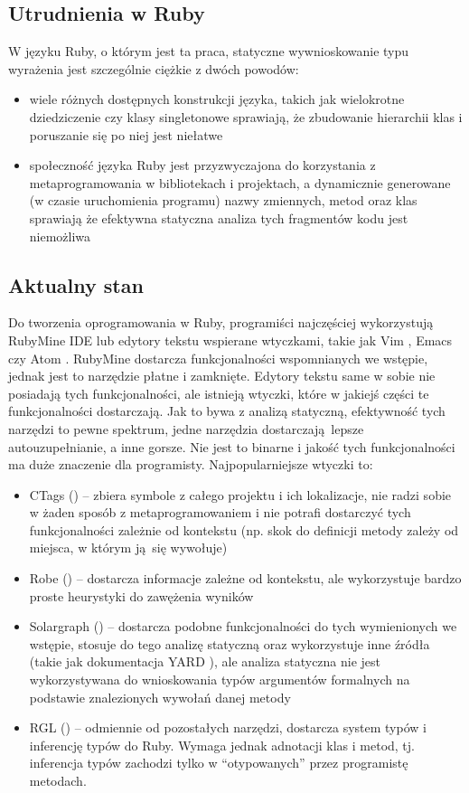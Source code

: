 \documentclass[shortabstract,mgr]{iithesis}
\begin{document}
\subsection{Utrudnienia w Ruby}

W języku Ruby, o którym jest ta praca, statyczne wywnioskowanie typu wyrażenia jest szczególnie ciężkie z dwóch powodów:
\begin{itemize}
\item wiele różnych dostępnych konstrukcji języka, takich jak wielokrotne dziedziczenie czy klasy singletonowe sprawiają, że zbudowanie hierarchii klas i poruszanie się po niej jest niełatwe
\item społeczność języka Ruby jest przyzwyczajona do korzystania z metaprogramowania w bibliotekach i projektach, a dynamicznie generowane (w czasie uruchomienia programu) nazwy zmiennych, metod oraz klas sprawiają że efektywna statyczna analiza tych fragmentów kodu jest niemożliwa
\end{itemize}

\subsection{Aktualny stan}

Do tworzenia oprogramowania w Ruby, programiści najczęściej wykorzystują RubyMine IDE \cite{RUBYMINE} lub edytory tekstu wspierane wtyczkami, takie jak Vim \cite{VIM}, Emacs \cite{EMACS} czy Atom \cite{ATOM}.
RubyMine dostarcza funkcjonalności wspomnianych we wstępie, jednak jest to narzędzie płatne i zamknięte.
Edytory tekstu same w sobie nie posiadają tych funkcjonalności, ale istnieją wtyczki, które w jakiejś części te funkcjonalności dostarczają. Jak to bywa z analizą statyczną, efektywność tych narzędzi to pewne spektrum, jedne narzędzia dostarczają lepsze autouzupełnianie, a inne gorsze. Nie jest to binarne i jakość tych funkcjonalności ma duże znaczenie dla programisty.
Najpopularniejsze wtyczki to:
\begin{itemize}
\item CTags (\cite{CTAGS}) -- zbiera symbole z całego projektu i ich lokalizacje, nie radzi sobie w żaden sposób z metaprogramowaniem i nie potrafi dostarczyć tych funkcjonalności zależnie od kontekstu (np. skok do definicji metody zależy od miejsca, w którym ją się wywołuje)
\item Robe (\cite{ROBE}) -- dostarcza informacje zależne od kontekstu, ale wykorzystuje bardzo proste heurystyki do zawężenia wyników
\item Solargraph (\cite{SOLARGRAPH}) -- dostarcza podobne funkcjonalności do tych wymienionych we wstępie, stosuje do tego analizę statyczną oraz wykorzystuje inne źródła (takie jak dokumentacja YARD \cite{YARD}), ale analiza statyczna nie jest wykorzystywana do wnioskowania typów argumentów formalnych na podstawie znalezionych wywołań danej metody
\item RGL (\cite{RDL}) -- odmiennie od pozostałych narzędzi, dostarcza system typów i inferencję typów do Ruby. Wymaga jednak adnotacji klas i metod, tj. inferencja typów zachodzi tylko w ``otypowanych'' przez programistę metodach.
\end{itemize}
\end{document}
